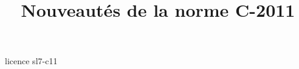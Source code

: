 \documentclass [xcolor=table] {beamer}
\title {Nouveautés de la norme C-2011}
\begin{document}
 {licence}
 {sl7-c11}
\end{document}
